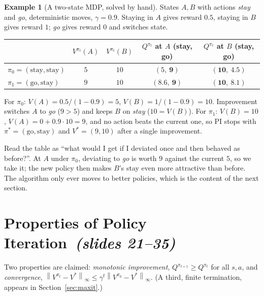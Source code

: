 \documentclass[11pt,a4paper]{article}
\newcommand{\norm}[1]{\left\lVert #1\right\rVert_\infty}
\newcommand{\sltag}[1]{\texorpdfstring{\ \emph{(slides #1)}}{ (slides #1)}}
\theoremstyle{plain}
\theoremstyle{definition}
\newtheorem{example}[theorem]{Example}
\theoremstyle{remark}
\begin{document}
\begin{example}[A two-state MDP, solved by hand]\label{ex:two}
States $A,B$ with actions \emph{stay} and \emph{go}, deterministic moves, $\gamma=0.9$. Staying in $A$ gives reward $0.5$, staying in $B$ gives reward $1$; \emph{go} gives reward $0$ and switches state.
\begin{center}\small
\begin{tabular}{@{}lcccc@{}}\toprule
 & $V^{\pi_t}(A)$ & $V^{\pi_t}(B)$ & $Q^{\pi_t}$ at $A$ (stay, go) & $Q^{\pi_t}$ at $B$ (stay, go)\\\midrule
$\pi_0=(\text{stay},\text{stay})$ & $5$ & $10$ & $(5,\ \mathbf{9})$ & $(\mathbf{10},\ 4.5)$\\
$\pi_1=(\text{go},\text{stay})$ & $9$ & $10$ & $(8.6,\ \mathbf{9})$ & $(\mathbf{10},\ 8.1)$\\\bottomrule
\end{tabular}
\end{center}
For $\pi_0$: $V(A)=0.5/(1-0.9)=5$, $V(B)=1/(1-0.9)=10$. Improvement switches $A$ to \emph{go} ($9>5$) and keeps $B$ on \emph{stay} ($10=V(B)$). For $\pi_1$: $V(B)=10$, $V(A)=0+0.9\cdot10=9$, and no action beats the current one, so PI stops with $\pi^*=(\text{go},\text{stay})$ and $V^*=(9,10)$ after a single improvement.
\end{example}

\begin{intuition}
Read the table as ``what would I get if I deviated once and then behaved as before?''. At $A$ under $\pi_0$, deviating to \emph{go} is worth $9$ against the current $5$, so we take it; the new policy then makes $B$'s stay even more attractive than before. The algorithm only ever moves to better policies, which is the content of the next section.
\end{intuition}

\section{Properties of Policy Iteration\sltag{21--35}}
Two properties are claimed: \emph{monotonic improvement}, $Q^{\pi_{t+1}}\ge Q^{\pi_t}$ for all $s,a$, and \emph{convergence}, $\norm{V^{\pi_t}-V^*}\le\gamma^t\norm{V^{\pi_0}-V^*}$. (A third, finite termination, appears in Section~\ref{sec:maxit}.)
\end{document}
